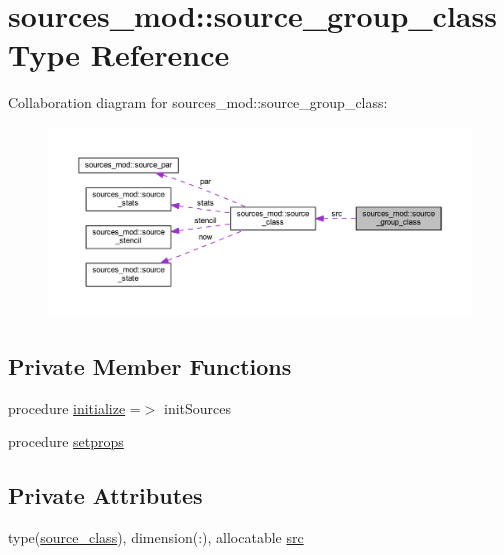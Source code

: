 \hypertarget{structsources__mod_1_1source__group__class}{}\section{sources\+\_\+mod\+:\+:source\+\_\+group\+\_\+class Type Reference}
\label{structsources__mod_1_1source__group__class}


Collaboration diagram for sources\+\_\+mod\+:\+:source\+\_\+group\+\_\+class\+:\nopagebreak
\begin{figure}[H]
\begin{center}
\leavevmode
\includegraphics[width=350pt]{structsources__mod_1_1source__group__class__coll__graph}
\end{center}
\end{figure}
\subsection*{Private Member Functions}
\begin{DoxyCompactItemize}
\item 
procedure \hyperlink{structsources__mod_1_1source__group__class_a186abc677118adbf1f9cff405dac330e}{initialize} =$>$ init\+Sources
\item 
procedure \hyperlink{structsources__mod_1_1source__group__class_af66df271111f0d2734b1e5122e42438e}{setprops}
\end{DoxyCompactItemize}
\subsection*{Private Attributes}
\begin{DoxyCompactItemize}
\item 
type(\hyperlink{structsources__mod_1_1source__class}{source\+\_\+class}), dimension(\+:), allocatable \hyperlink{structsources__mod_1_1source__group__class_af970ce2c935528f707bdbf4169995d7c}{src}
\end{DoxyCompactItemize}


